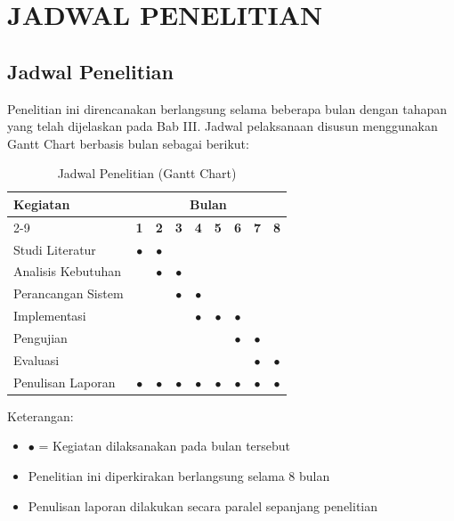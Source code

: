 \chapter{JADWAL PENELITIAN}

\section{Jadwal Penelitian}


Penelitian ini direncanakan berlangsung selama beberapa bulan dengan tahapan yang telah dijelaskan pada Bab III. Jadwal pelaksanaan disusun menggunakan Gantt Chart berbasis bulan sebagai berikut:

\begin{table}[H]
\centering
\caption{Jadwal Penelitian (Gantt Chart)}
\begin{tabular}{|l|c|c|c|c|c|c|c|c|}
\hline
\multirow{2}{*}{\textbf{Kegiatan}} & \multicolumn{8}{c|}{\textbf{Bulan}} \\
\cline{2-9}
 & \textbf{1} & \textbf{2} & \textbf{3} & \textbf{4} & \textbf{5} & \textbf{6} & \textbf{7} & \textbf{8} \\
\hline
Studi Literatur & $\bullet$ & $\bullet$ & & & & & & \\
\hline
Analisis Kebutuhan & & $\bullet$ & $\bullet$ & & & & & \\
\hline
Perancangan Sistem & & & $\bullet$ & $\bullet$ & & & & \\
\hline
Implementasi & & & & $\bullet$ & $\bullet$ & $\bullet$ & & \\
\hline
Pengujian & & & & & & $\bullet$ & $\bullet$ & \\
\hline
Evaluasi & & & & & & & $\bullet$ & $\bullet$ \\
\hline
Penulisan Laporan & $\bullet$ & $\bullet$ & $\bullet$ & $\bullet$ & $\bullet$ & $\bullet$ & $\bullet$ & $\bullet$ \\
\hline
\end{tabular}
\end{table}

Keterangan:
\begin{itemize}
    \item $\bullet$ = Kegiatan dilaksanakan pada bulan tersebut
    \item Penelitian ini diperkirakan berlangsung selama 8 bulan
    \item Penulisan laporan dilakukan secara paralel sepanjang penelitian
\end{itemize}


